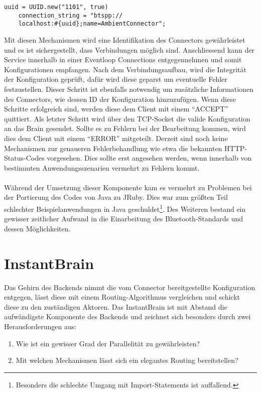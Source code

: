 \lstset{language=Ruby}
\begin{lstlisting}[caption=Erzeugung einer UUID und Bereitstellung des Bluetooth-Service, captionpos=b]
	uuid = UUID.new("1101", true)
	connection_string = "btspp://		  
	localhost:#{uuid};name=AmbientConnector";	
\end{lstlisting}
Mit diesen Mechanismen wird eine Identifikation des Connectors gewährleistet und es ist sichergestellt, dass Verbindungen möglich sind. Anschliessend kann der Service innerhalb in einer Eventloop Connections entgegennehmen und somit Konfigurationen empfangen. Nach dem Verbindungsaufbau, wird die Integrität der Konfiguration geprüft, dafür wird diese geparst um eventuelle Fehler festzustellen. Dieser Schritt ist ebenfalls notwendig um zusätzliche Informationen des Connectors, wie dessen ID der Konfiguration hinzuzufügen. Wenn diese Schritte erfolgreich sind, werden diese dem Client mit einem "`ACCEPT"' quittiert. 
Als letzter Schritt wird über den TCP-Socket die valide Konfiguration an das Brain gesendet. 
Sollte es zu Fehlern bei der Bearbeitung kommen, wird dies dem Client mit einem "`ERROR"'	 mitgeteilt. Derzeit sind noch keine Mechanismen zur genaueren Fehlerbehandlung wie etwa die bekannten HTTP-Status-Codes vorgesehen. Dies sollte erst angesehen werden, wenn innerhalb von bestimmten Anwendungsszenarien vermehrt zu Fehlern kommt. 
\\\\
Während der Umsetzung dieser Komponente kam es vermehrt zu Problemen bei der Portierung des Codes von Java zu JRuby. Dies war zum größten Teil schlechter Beispielanwendungen in Java geschuldet\footnote{Besonders die schlechte Umgang mit Import-Statements ist auffallend.}. Des Weiteren bestand ein gewisser zeitlicher Aufwand in die Einarbeitung des Bluetooth-Standards und dessen Möglichkeiten. 

\section{InstantBrain}
Das Gehirn des Backends nimmt die vom Connector bereitgestellte Konfiguration entgegen, lässt diese mit einem Routing-Algorithmus vergleichen und schickt diese zu den zuständigen Aktoren. 
Das InstantBrain ist mit Abstand die aufwändigste Komponente des Backends und zeichnet sich besonders durch zwei Herausforderungen aus: 
\begin{enumerate}
     \item Wie ist ein gewisser Grad der Parallelität zu gewährleisten? 
     \item Mit welchen Mechanismen lässt sich ein elegantes Routing bereitstellen? 
\end{enumerate}

